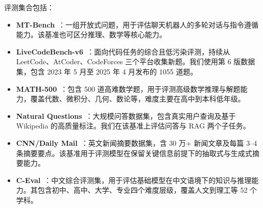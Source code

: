 \documentclass{article} %
\begin{document}
评测集合包括：
\begin{itemize}
    \item \textbf{MT-Bench}~\citep{zheng2023judging}：一组开放式问题，用于评估聊天机器人的多轮对话与指令遵循能力。该基准也可区分推理、数学等核心能力。

    \item \textbf{LiveCodeBench-v6}~\citep{jain2024livecodebench}：面向代码任务的综合且低污染评测，持续从 LeetCode、AtCoder、CodeForces 三个平台收集新题。我们使用第 6 版数据集，包含 2023 年 5 月至 2025 年 4 月发布的 1055 道题。

    \item \textbf{MATH-500}~\citep{lightman2023lets}：包含 500 道高难数学题，用于评测高级数学推理与解题能力，覆盖代数、微积分、几何、数论等，难度主要在高中到本科低年级。

    \item \textbf{Natural Questions}~\citep{kwiatkowski2019natural}：大规模问答数据集，包含真实用户查询及基于 Wikipedia 的高质量标注。我们在该基准上评估问答与 RAG 两个子任务。

    \item \textbf{CNN/Daily Mail}~\citep{nallapati2016abstractive}：英文新闻摘要数据集，含 30 万+ 新闻文章及每篇 3--4 条摘要要点。该基准用于评测模型在保留关键信息前提下的抽取式与生成式摘要能力。

    \item \textbf{C-Eval}~\citep{huang2023ceval}：中文综合评测集，用于评估基础模型在中文语境下的知识与推理能力。其包含初中、高中、大学、专业四个难度层级，覆盖人文到理工等 52 个学科。
\end{itemize}
\end{document}
